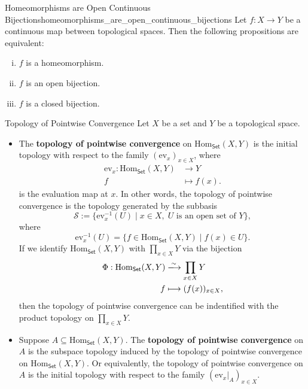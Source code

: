 \documentclass{report}
\begin{document}
\begin{proposition}{Homeomorphisms are Open Continuous Bijections}{homeomorphisms_are_open_continuous_bijections}
	Let $f:X\to Y$ be a continuous map between topological spaces. Then the following propositions are equivalent:
	\begin{enumerate}[(i)]
		\item $f$ is a homeomorphism.
		\item $f$ is an open bijection.
		\item $f$ is a closed bijection.
	\end{enumerate}
\end{proposition}

\begin{definition}{Topology of Pointwise Convergence}{}
	Let $X$ be a set and $Y$ be a topological space. 
	\begin{itemize}
		\item The \textbf{topology of pointwise convergence} on $\mathrm{Hom}_{\mathsf{Set}}(X,Y)$ is the initial topology with respect to the family $\left( \mathrm{ev}_x \right)_{x\in X}$, where 
		\begin{align*}
			\mathrm{ev}_x:\mathrm{Hom}_{\mathsf{Set}}(X,Y)&\longrightarrow Y\\
			f&\longmapsto f(x).
		\end{align*}
		is the evaluation map at $x$. In other words, the topology of pointwise convergence is the topology generated by the subbasis
		\[
		\mathcal{S}:=\{\mathrm{ev}_x^{-1}(U)\mid x\in X, \;U\text{ is an open set of }Y\},
		\]
		where
		\[
			\mathrm{ev}_x^{-1}(U)=\{f\in \mathrm{Hom}_{\mathsf{Set}}(X,Y)\mid f(x)\in U\}.
		\]
		If we identify $\mathrm{Hom}_{\mathsf{Set}}(X,Y)$ with $\prod\limits_{x\in X}Y$ via the bijection 
		\begin{align*}
		\Phi:\mathrm{Hom}_{\mathsf{Set}}(X,Y)&\xlongrightarrow{\sim} \prod_{x\in X}Y\\	
		f&\longmapsto (f(x))_{x\in X}, 
		\end{align*}
		then the topology of pointwise convergence can be indentified with the product topology on $\prod\limits_{x\in X}Y$.
		\item Suppose $A\subseteq \mathrm{Hom}_{\mathsf{Set}}(X,Y)$. The \textbf{topology of pointwise convergence} on $A$ is the subspace topology induced by the topology of pointwise convergence on $\mathrm{Hom}_{\mathsf{Set}}(X,Y)$. Or equivalently, the topology of pointwise convergence on $A$ is the initial topology with respect to the family $\left( \mathrm{ev}_x|_{A} \right)_{x\in X}$.
	\end{itemize}
\end{definition}
\end{document}

